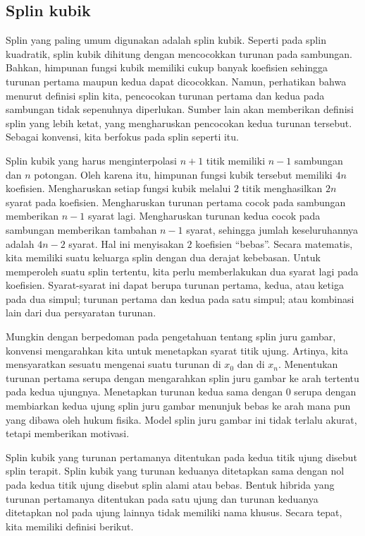 \subsection{Splin kubik}

Splin yang paling umum digunakan adalah splin kubik. Seperti pada
splin kuadratik, splin kubik dihitung dengan mencocokkan turunan pada
sambungan. Bahkan, himpunan fungsi kubik memiliki cukup banyak koefisien
sehingga turunan pertama maupun kedua dapat dicocokkan. Namun, perhatikan
bahwa menurut definisi splin kita, pencocokan turunan pertama dan
kedua pada sambungan tidak sepenuhnya diperlukan. Sumber lain akan
memberikan definisi splin yang lebih ketat, yang mengharuskan pencocokan
kedua turunan tersebut. Sebagai konvensi, kita berfokus pada splin
seperti itu.

Splin kubik yang harus menginterpolasi $n+1$ titik memiliki $n-1$
sambungan dan $n$ potongan. Oleh karena itu, himpunan fungsi kubik
tersebut memiliki $4n$ koefisien. Mengharuskan setiap fungsi kubik
melalui $2$ titik menghasilkan $2n$ syarat pada koefisien. Mengharuskan
turunan pertama cocok pada sambungan memberikan $n-1$ syarat lagi.
Mengharuskan turunan kedua cocok pada sambungan memberikan tambahan
$n-1$ syarat, sehingga jumlah keseluruhannya adalah $4n-2$ syarat.
Hal ini menyisakan $2$ koefisien ``bebas''. Secara matematis, kita
memiliki suatu keluarga splin dengan dua derajat kebebasan. Untuk
memperoleh suatu splin tertentu, kita perlu memberlakukan dua syarat
lagi pada koefisien. Syarat-syarat ini dapat berupa turunan pertama,
kedua, atau ketiga pada dua simpul; turunan pertama dan kedua pada
satu simpul; atau kombinasi lain dari dua persyaratan turunan.

Mungkin dengan berpedoman pada pengetahuan tentang splin juru gambar,
konvensi mengarahkan kita untuk menetapkan syarat titik ujung. Artinya,
kita mensyaratkan sesuatu mengenai suatu turunan di $x_{0}$ dan di
$x_{n}$. Menentukan turunan pertama serupa dengan mengarahkan splin
juru gambar ke arah tertentu pada kedua ujungnya. Menetapkan turunan
kedua sama dengan $0$ serupa dengan membiarkan kedua ujung splin
juru gambar menunjuk bebas ke arah mana pun yang dibawa oleh hukum
fisika. Model splin juru gambar ini tidak terlalu akurat, tetapi memberikan
motivasi. 

Splin kubik yang turunan pertamanya ditentukan pada kedua titik ujung
disebut splin terapit. Splin kubik yang turunan keduanya ditetapkan
sama dengan nol pada kedua titik ujung disebut splin alami atau bebas.
Bentuk hibrida yang turunan pertamanya ditentukan pada satu ujung
dan turunan keduanya ditetapkan nol pada ujung lainnya tidak memiliki
nama khusus. Secara tepat, kita memiliki definisi berikut.

